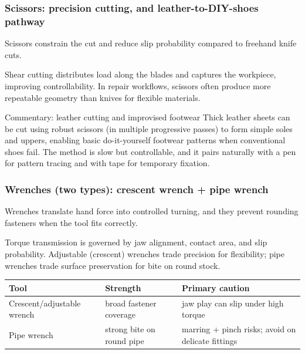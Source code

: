 \begin{frame}[t]
  \frametitle{Scissors: precision cutting, and leather-to-DIY-shoes pathway}
  \justifying
   Scissors constrain the cut and reduce slip probability compared to freehand knife cuts.

  \vspace{0.5em}
   Shear cutting distributes load along the blades and captures the workpiece, improving controllability. In repair workflows, scissors often produce more repeatable geometry than knives for flexible materials.

  \vspace{0.8em}
  \begin{block}{Commentary: leather cutting and improvised footwear}
    Thick leather sheets can be cut using robust scissors (in multiple progressive passes) to form simple soles and uppers, enabling basic do-it-yourself footwear patterns when conventional shoes fail. The method is slow but controllable, and it pairs naturally with a pen for pattern tracing and with tape for temporary fixation.
  \end{block}

\end{frame}

\begin{frame}[t]
  \frametitle{Wrenches (two types): crescent wrench + pipe wrench}
  \justifying
   Wrenches translate hand force into controlled turning, and they prevent rounding fasteners when the tool fits correctly.

  \vspace{0.5em}
   Torque transmission is governed by jaw alignment, contact area, and slip probability. Adjustable (crescent) wrenches trade precision for flexibility; pipe wrenches trade surface preservation for bite on round stock.

  \vspace{0.8em}
  \TableBodySize
  \begin{table}
    \centering
    \begin{tabularx}{\textwidth}{@{}lX X@{}}
      \toprule
      \textbf{Tool} & \textbf{Strength} & \textbf{Primary caution} \\
      \midrule
      Crescent/adjustable wrench & broad fastener coverage & jaw play can slip under high torque \\
      Pipe wrench & strong bite on round pipe & marring + pinch risks; avoid on delicate fittings \\
      \bottomrule
    \end{tabularx}
  \end{table}
\end{frame}

